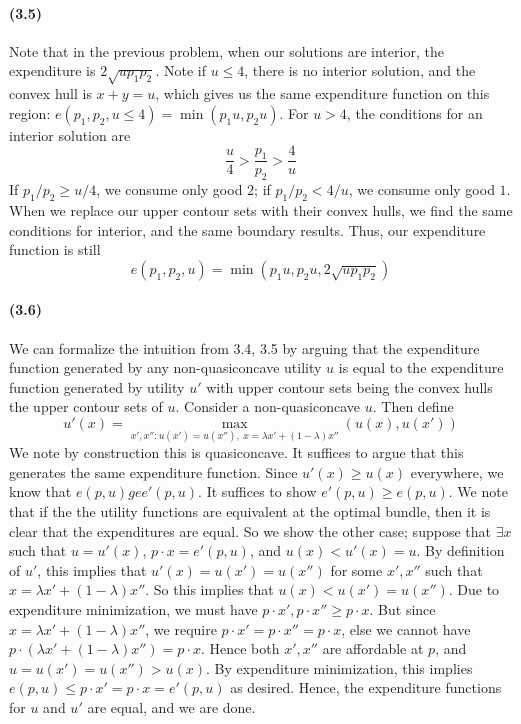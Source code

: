 \documentclass[10pt,letter]{article}
\begin{document}
\paragraph{(3.5)}
Note that in the previous problem, when our solutions are interior, the expenditure is $2 \sqrt{u p_1 p_2}$. Note if $u \le 4$, there is no interior solution, and the convex hull is $x+y = u$, which gives us the same expenditure function on this region: $e(p_1, p_2, u \le 4) = \min(p_1 u, p_2 u)$. For $u > 4$, the conditions for an interior solution are
\[ \frac{u}{4} > \frac{p_1}{p_2} > \frac{4}{u}\]
If $p_1/p_2 \ge u/4$, we consume only good $2$; if $p_1/p_2 < 4/u$, we consume only good $1$. When we replace our upper contour sets with their convex hulls, we find the same conditions for interior, and the same boundary results. Thus, our expenditure function is still
\[ e(p_1, p_2, u) = \min(p_1 u, p_2 u, 2\sqrt{up_1p_2}) \]
\paragraph{(3.6)}
We can formalize the intuition from 3.4, 3.5 by arguing that the expenditure function generated by any non-quasiconcave utility $u$ is equal to the expenditure function generated by utility $u'$ with upper contour sets being the convex hulls the upper contour sets of $u$. Consider a non-quasiconcave $u$. Then define \[ u'(x) = \max_{x', x'': u(x') = u(x''), \ x = \lambda x' + (1-\lambda)x''}(u(x), u(x')) \] We note by construction this is quasiconcave. It suffices to argue that this generates the same expenditure function. Since $u'(x) \ge u(x)$ everywhere, we know that $e(p, u) ge e'(p,u)$. It suffices to show $e'(p, u) \ge e(p,u)$. We note that if the the utility functions are equivalent at the optimal bundle, then it is clear that the expenditures are equal. So we show the other case; suppose that $\exists x$ such that $u = u'(x)$, $p\cdot x = e'(p,u)$, and $u(x) < u'(x) = u$. By definition of $u'$, this implies that $u'(x) = u(x') = u(x'')$ for some $x', x''$ such that $x = \lambda x' + (1-\lambda)x''$. So this implies that $u(x) < u(x') = u(x'')$. Due to expenditure minimization, we must have $p \cdot x', p\cdot x'' \ge p \cdot x$. But since $x = \lambda x' + (1-\lambda)x''$, we require $p \cdot x' = p\cdot x'' = p \cdot x$, else we cannot have $p \cdot (\lambda x' + (1-\lambda)x'') = p\cdot x$. Hence both $x', x''$ are affordable at $p$, and $u = u(x') = u(x'') > u(x)$. By expenditure minimization, this implies $e(p,u) \le p \cdot x' = p \cdot x = e'(p,u) $ as desired. Hence, the expenditure functions for $u$ and $u'$ are equal, and we are done.
\end{document}

